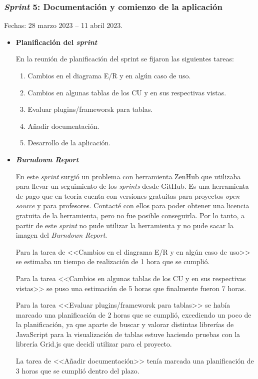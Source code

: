 \subsubsection{\textit{Sprint} 5: Documentación y comienzo de la aplicación}
Fechas: 28 marzo 2023 -- 11 abril 2023.
\begin{itemize}
\item\textbf{Planificación del \textit{sprint}}

En la reunión de planificación del sprint se fijaron las siguientes tareas:
\begin{enumerate}
		\item Cambios en el diagrama E/R y en algún caso de uso.
		\item Cambios en algunas tablas de los CU y en sus respectivas vistas.
		\item Evaluar plugins/frameworsk para tablas.
		\item Añadir documentación.
		\item Desarrollo de la aplicación.
\end{enumerate}

\item\textbf{\textit{Burndown Report}}

En este \textit{sprint} surgió un problema con herramienta ZenHub que utilizaba para llevar un seguimiento de los \textit{sprints} desde GitHub. Es una herramienta de pago que en teoría cuenta con versiones gratuitas para proyectos \textit{open source} y para profesores. Contacté con ellos para poder obtener una licencia gratuita de la herramienta, pero no fue posible conseguirla. Por lo tanto, a partir de este \textit{sprint} no pude utilizar la herramienta y no pude sacar la imagen del \textit{Burndown Report}.

Para la tarea de <<Cambios en el diagrama E/R y en algún caso de uso>> se estimaba un tiempo de realización de 1 hora que se cumplió.

Para la tarea <<Cambios en algunas tablas de los CU y en sus respectivas vistas>> se puso una estimación de 5 horas que finalmente fueron 7 horas.

Para la tarea <<Evaluar plugins/frameworsk para tablas>> se había marcado una planificación de 2 horas que se cumplió, excediendo un poco de la planificación, ya que aparte de buscar y valorar distintas librerías de JavaScript para la visualización de tablas estuve haciendo pruebas con la librería Grid.js que decidí utilizar para el proyecto.

La tarea de <<Añadir documentación>> tenía marcada una planificación de 3 horas que se cumplió dentro del plazo.


\end{itemize}
